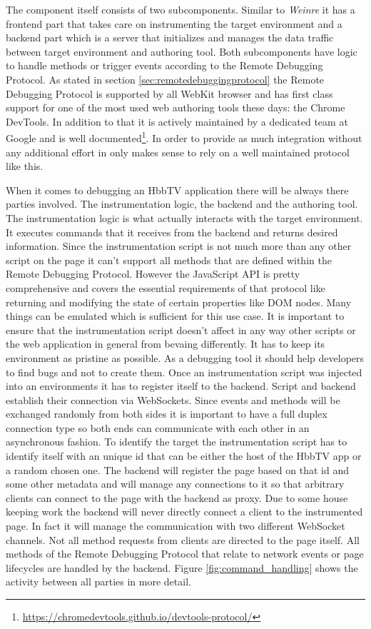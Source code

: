 The component itself consists of two subcomponents. Similar to \textit{Weinre} it has a frontend
part that takes care on instrumenting the target environment and a backend part which is a server
that initializes and manages the data traffic between target environment and authoring tool. Both
subcomponents have logic to handle methods or trigger events according to the Remote Debugging
Protocol. As stated in section \ref{sec:remotedebuggingprotocol} the Remote Debugging Protocol is
supported by all WebKit browser and has first class support for one of the most used web authoring
tools these days: the Chrome DevTools. In addition to that it is actively maintained by a dedicated
team at Google and is well documented\footnote{\url{https://chromedevtools.github.io/devtools-protocol/}}.
In order to provide as much integration without any additional effort in only makes sense to rely on
a well maintained protocol like this.

When it comes to debugging an HbbTV application there will be always there parties involved. The
instrumentation logic, the backend and the authoring tool. The instrumentation logic is what actually
interacts with the target environment. It executes commands that it receives from the backend and
returns desired information. Since the instrumentation script is not much more than any other script
on the page it can't support all methods that are defined within the Remote Debugging Protocol.
However the JavaScript API is pretty comprehensive and covers the essential requirements of that
protocol like returning and modifying the state of certain properties like DOM nodes. Many things can
be emulated which is sufficient for this use case. It is important to ensure that the instrumentation
script doesn't affect in any way other scripts or the web application in general from bevaing
differently. It has to keep its environment as pristine as possible. As a debugging tool it should
help developers to find bugs and not to create them. Once an instrumentation script was injected
into an environments it has to register itself to the backend. Script and backend establish their
connection via WebSockets. Since events and methods will be exchanged randomly from both sides
it is important to have a full duplex connection type so both ends can communicate with each other
in an asynchronous fashion. To identify the target the instrumentation script has to identify
itself with an unique id that can be either the host of the HbbTV app or a random chosen one. The
backend will register the page based on that id and some other metadata and will manage any
connections to it so that arbitrary clients can connect to the page with the backend as proxy. Due
to some house keeping work the backend will never directly connect a client to the instrumented
page. In fact it will manage the communication with two different WebSocket channels. Not all method
requests from clients are directed to the page itself. All methods of the Remote Debugging Protocol
that relate to network events or page lifecycles are handled by the backend. Figure \ref{fig:command_handling}
shows the activity between all parties in more detail.

